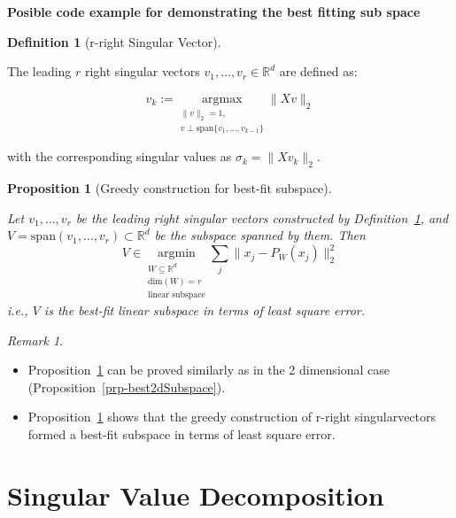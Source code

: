 \documentclass[
  letterpaper,
  DIV=11,
  numbers=noendperiod]{scrreprt}
\providecommand{\tightlist}{%
  \setlength{\itemsep}{0pt}\setlength{\parskip}{0pt}}
\theoremstyle{definition}
\newtheorem{definition}{Definition}[chapter]
\theoremstyle{plain}
\theoremstyle{plain}
\newtheorem{proposition}{Proposition}[chapter]
\theoremstyle{definition}
\theoremstyle{plain}
\theoremstyle{plain}
\theoremstyle{remark}
\newtheorem{refremark}{Remark}[chapter]
\begin{document}
\textbf{Posible code example for demonstrating the best fitting sub
space}

\begin{definition}[r-right Singular
Vector]\protect\hypertarget{def-rSingularVec}{}\label{def-rSingularVec}

The leading \(r\) right singular vectors
\(v_1, \dots, v_r \in \mathbb{R}^d\) are defined as:

\[
v_k := \underset{
  \substack{
  \|v\|_2=1,\, \\ v \perp \text{span}\{v_1, \dots, v_{k-1}\}
  }
  }{\mathrm{argmax}}{} \|Xv\|_2
\]

with the corresponding singular values as \(\sigma_k = \|Xv_k\|_2\).

\end{definition}

\begin{proposition}[Greedy construction for best-fit
subspace]\protect\hypertarget{prp-bestRSubspace}{}\label{prp-bestRSubspace}

Let \(v_1, \dots, v_r\) be the leading right singular vectors
constructed by Definition~\ref{def-rSingularVec}, and
\(V = \mathrm{span}(v_1, \dots, v_r) \subset \mathbb{R}^d\) be the
subspace spanned by them. Then \[
V \in \underset{
  \substack{W\subseteq \mathbb{R}^d \\ \mathrm{dim}(W) = r \\ \text{linear subspace}}
}{\mathrm{argmin}}\sum_j \|x_j - P_W(x_j)\|_2^2
\] i.e., \(V\) is the best-fit linear subspace in terms of least square
error.

\end{proposition}

\begin{refremark}
\leavevmode

\begin{itemize}
\tightlist
\item
  Proposition~\ref{prp-bestRSubspace} can be proved similarly as in the
  2 dimensional case (Proposition~\ref{prp-best2dSubspace}).
\item
  Proposition~\ref{prp-bestRSubspace} shows that the greedy construction
  of r-right singularvectors formed a best-fit subspace in terms of
  least square error.
\end{itemize}

\label{rem-bestRsubspace}

\end{refremark}

\section{Singular Value
Decomposition}\label{singular-value-decomposition-1}
\end{document}
